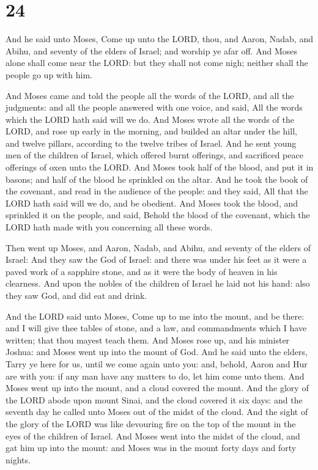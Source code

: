 \hypertarget{section-23}{%
\section{24}\label{section-23}}

 And he said unto Moses, Come up unto the LORD, thou, and
Aaron, Nadab, and Abihu, and seventy of the elders of Israel; and
worship ye afar off.  And Moses alone shall come near the
LORD: but they shall not come nigh; neither shall the people go up with
him.

 And Moses came and told the people all the words of the
LORD, and all the judgments: and all the people answered with one voice,
and said, All the words which the LORD hath said will we do.
 And Moses wrote all the words of the LORD, and rose up
early in the morning, and builded an altar under the hill, and twelve
pillars, according to the twelve tribes of Israel.  And he
sent young men of the children of Israel, which offered burnt offerings,
and sacrificed peace offerings of oxen unto the LORD.  And
Moses took half of the blood, and put it in basons; and half of the
blood he sprinkled on the altar.  And he took the book of
the covenant, and read in the audience of the people: and they said, All
that the LORD hath said will we do, and be obedient.  And
Moses took the blood, and sprinkled it on the people, and said, Behold
the blood of the covenant, which the LORD hath made with you concerning
all these words.

 Then went up Moses, and Aaron, Nadab, and Abihu, and
seventy of the elders of Israel:  And they saw the God of
Israel: and there was under his feet as it were a paved work of a
sapphire stone, and as it were the body of heaven in his clearness.
 And upon the nobles of the children of Israel he laid not
his hand: also they saw God, and did eat and drink.

 And the LORD said unto Moses, Come up to me into the
mount, and be there: and I will give thee tables of stone, and a law,
and commandments which I have written; that thou mayest teach them.
 And Moses rose up, and his minister Joshua: and Moses went
up into the mount of God.  And he said unto the elders,
Tarry ye here for us, until we come again unto you: and, behold, Aaron
and Hur are with you: if any man have any matters to do, let him come
unto them.  And Moses went up into the mount, and a cloud
covered the mount.  And the glory of the LORD abode upon
mount Sinai, and the cloud covered it six days: and the seventh day he
called unto Moses out of the midst of the cloud.  And the
sight of the glory of the LORD was like devouring fire on the top of the
mount in the eyes of the children of Israel.  And Moses
went into the midst of the cloud, and gat him up into the mount: and
Moses was in the mount forty days and forty nights.

